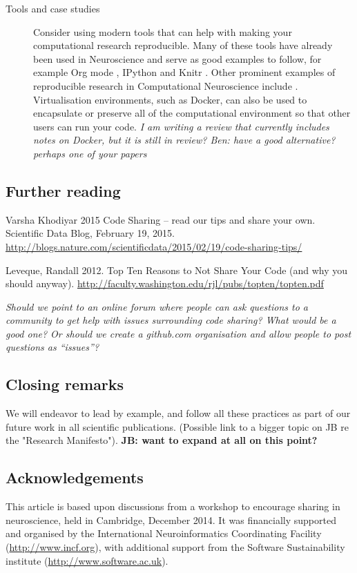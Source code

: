 \documentclass[11pt]{article}
\begin{document}
\begin{description}
\item [Tools and case studies] Consider using modern tools that can
  help with making your computational research reproducible.  Many of
  these tools have already been used in Neuroscience and serve as good
  examples to follow, for example Org mode \cite{Delescluse2011},
  IPython \cite{Stevens2013} and Knitr \cite{Eglen2014}.  Other
  prominent examples of reproducible research in Computational
  Neuroscience include \cite{Vogels2011-c8c,Waskom2014-gd}.
  Virtualisation environments, such as Docker, can also be used to
  encapsulate or preserve all of the computational environment so that
  other users can run your code.  \textit{I am writing a review that
    currently includes notes on Docker, but it is still in review?
    Ben: have a good alternative?  perhaps one of your papers}
  

\end{description}

\subsection*{Further reading}

Varsha Khodiyar 2015 Code Sharing – read our tips and share your own. Scientific Data Blog, February 19, 2015. \url{http://blogs.nature.com/scientificdata/2015/02/19/code-sharing-tips/}

Leveque, Randall 2012. Top Ten Reasons to Not Share Your Code (and why
you should anyway). 
\url{http://faculty.washington.edu/rjl/pubs/topten/topten.pdf}

\textit{Should we point to an online forum where people can ask
  questions to a community to get help with issues surrounding code
  sharing?  What would be a good one?  Or should we create a
  github.com organisation and allow people to post questions as
  ``issues''?}

\subsection*{Closing remarks}

We will endeavor to lead by example, and follow all these practices as
part of our future work in all scientific publications.  (Possible
link to a bigger topic on JB re the "Research Manifesto").
\textbf{JB: want to expand at all on this point?}

\subsection*{Acknowledgements}

This article is based upon discussions from a workshop to encourage
sharing in neuroscience, held in Cambridge, December 2014.  It was
financially supported and organised by the International
Neuroinformatics Coordinating Facility (\url{http://www.incf.org}),
with additional support from the Software Sustainability institute
(\url{http://www.software.ac.uk}).



\printbibliography
\end{document}
